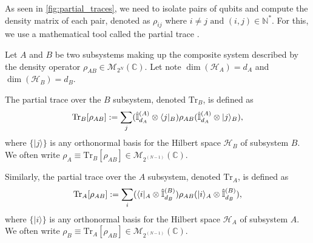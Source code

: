 As seen in \ref{fig:partial_traces}, we need to isolate 
pairs of qubits and compute the density matrix of each pair, denoted as 
\( \rho_{ij} \) where \( i \neq j \text{ and } (i,j) \in \mathbb{N}^* \). 
For this, we use a mathematical tool called the partial trace \cite{bradley_at_2020}.



Let $A$ and $B$ be two subsystems making up the composite system described by the density operator 
$\rho_{AB} \in \mathcal{M}_{2^N}(\mathbb{C})$.
Let note $\dim(\mathcal{H}_A) = d_A$ and $\dim(\mathcal{H}_B) = d_B$.

The partial trace over the $B$ subsystem, denoted $\text{Tr}_B$, is defined as
\begin{equation}\label{eq: partial trace}
\text{Tr}_B[\rho_{AB}] := \sum_j (\hat{\mathbb{I}}_{d_A}^{(A)} \otimes \langle j|_B) \rho_{AB} (\hat{\mathbb{I}}_{d_A}^{(A)} \otimes |j\rangle_B), 
\end{equation}
where $\{|j\rangle\}$ is any orthonormal basis for the Hilbert space $\mathcal{H}_B$ of subsystem $B$. 
We often write $\rho_A \equiv \text{Tr}_B[\rho_{AB}] \in \mathcal{M}_{2^{(N-1)}}(\mathbb{C})$. 




Similarly, the partial trace over the $A$ subsystem, denoted $\text{Tr}_A$, is defined as
\begin{equation}
\text{Tr}_A[\rho_{AB}] := \sum_i (\langle i|_A \otimes \hat{\mathbb{I}}_{d_B}^{(B)}) \rho_{AB} (|i\rangle_A \otimes \hat{\mathbb{I}}_{d_B}^{(B)}), 
\end{equation}
where $\{|i\rangle\}$ is any orthonormal basis for the Hilbert space $\mathcal{H}_A$ of subsystem $A$. 
We often write $\rho_B \equiv \text{Tr}_A[\rho_{AB}] \in \mathcal{M}_{2^{(N-1)}}(\mathbb{C})$.







